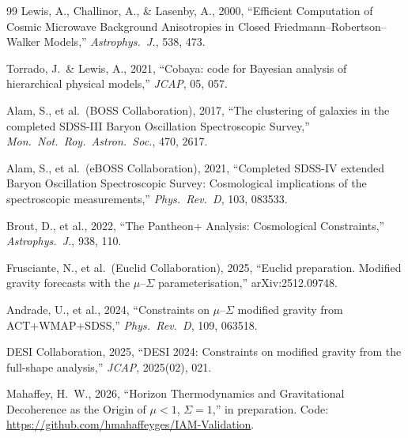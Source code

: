 \documentclass[11pt]{article}
\begin{document}
\begin{thebibliography}{99}
Lewis, A., Challinor, A., \& Lasenby, A., 2000, ``Efficient Computation of Cosmic Microwave Background Anisotropies in Closed Friedmann--Robertson--Walker Models,'' \textit{Astrophys.\ J.}, 538, 473.

Torrado, J.\ \& Lewis, A., 2021, ``Cobaya: code for Bayesian analysis of hierarchical physical models,'' \textit{JCAP}, 05, 057.

Alam, S., et al.\ (BOSS Collaboration), 2017, ``The clustering of galaxies in the completed SDSS-III Baryon Oscillation Spectroscopic Survey,'' \textit{Mon.\ Not.\ Roy.\ Astron.\ Soc.}, 470, 2617.

Alam, S., et al.\ (eBOSS Collaboration), 2021, ``Completed SDSS-IV extended Baryon Oscillation Spectroscopic Survey: Cosmological implications of the spectroscopic measurements,'' \textit{Phys.\ Rev.\ D}, 103, 083533.

Brout, D., et al., 2022, ``The Pantheon+ Analysis: Cosmological Constraints,'' \textit{Astrophys.\ J.}, 938, 110.

Frusciante, N., et al.\ (Euclid Collaboration), 2025, ``Euclid preparation. Modified gravity forecasts with the $\mu$--$\Sigma$ parameterisation,'' arXiv:2512.09748.

Andrade, U., et al., 2024, ``Constraints on $\mu$--$\Sigma$ modified gravity from ACT+WMAP+SDSS,'' \textit{Phys.\ Rev.\ D}, 109, 063518.

DESI Collaboration, 2025, ``DESI 2024: Constraints on modified gravity from the full-shape analysis,'' \textit{JCAP}, 2025(02), 021.

Mahaffey, H.~W., 2026, ``Horizon Thermodynamics and Gravitational Decoherence as the Origin of $\mu < 1$, $\Sigma = 1$,'' in preparation.
Code: \url{https://github.com/hmahaffeyges/IAM-Validation}.

\end{thebibliography}
\end{document}
